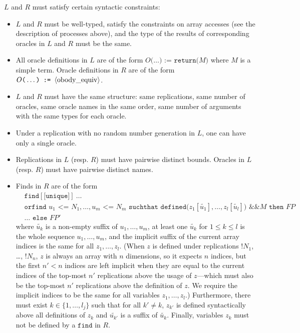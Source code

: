 \begin{itemize}
$L$ and $R$ must satisfy certain syntactic constraints:
\begin{itemize}

\item %
$L$ and $R$ must be well-typed, satisfy the constraints on
array accesses (see the description of processes above), 
and the type of the results of 
corresponding oracles in $L$ and $R$ must be the same.

\item All oracle definitions in $L$ are of the form 
$O\texttt{(}\ldots\texttt{) := return(}M\texttt{)}$
where $M$ is a simple term. %
Oracle definitions in $R$ are of the form 
$O\texttt{(}\ldots\texttt{) := }\langle\textrm{obody\_equiv}\rangle$.

\item $L$ and $R$ must have the same structure: same replications,
same number of oracles, same oracle names in the same order,
same number of arguments with the same types for each oracle.

\item Under a replication with no random number generation in $L$, 
one can have only a single oracle.

\item Replications in $L$ (resp. $R$) must have pairwise distinct
bounds. Oracles in $L$ (resp. $R$) must have pairwise distinct names.

\item %
\newcommand{\tup}[1]{\widetilde{#1}}

Finds in $R$ are of the form
\[\begin{split}
&\texttt{find}[\texttt{[unique]}]\ \ldots\\
&\texttt{orfind }u_1 \texttt{ <= } N_1, \ldots, u_m \texttt{ <= }N_m
\texttt{ suchthat defined(}z_1[\tup{u_1}], \ldots, z_l[\tup{u_l}]\texttt{) \&\& }M\texttt{ then }\mathit{FP}\\
&\ldots \texttt{ else }\mathit{FP}'
\end{split}\]
where $\tup{u_k}$ is a non-empty
suffix of $u_1, \ldots, u_m$, at least one $\tup{u_k}$ for $1 \leq
k \leq l$ is the whole sequence $u_1, \ldots, u_m$,
and the implicit suffix of the current array indices is the same
for all $z_1, \ldots, z_l$.
%
(When $z$ is defined under replications $\texttt{!}N_1$, \ldots,
$\texttt{!}N_n$, $z$ is always an array with $n$ dimensions, so it
expects $n$ indices, but the first $n'<n$ indices are left implicit
when they are equal to the current indices of the top-most $n'$ replications
above the usage of $z$---which must also be the top-most $n'$
replications above the definition of $z$. We require the implicit
indices to be the same for all variables $z_1, \ldots, z_l$.)
Furthermore, there must exist $k \in \{ 1, \ldots, l_j\}$ such that
for all $k' \neq k$, $z_{k'}$ is defined syntactically above all
definitions of $z_k$ and $\tup{u_{k'}}$ is a suffix of $\tup{u_k}$. 
%
Finally, variables $z_k$ must not be defined by a $\texttt{find}$ in $R$.



\end{itemize}
\end{itemize}
